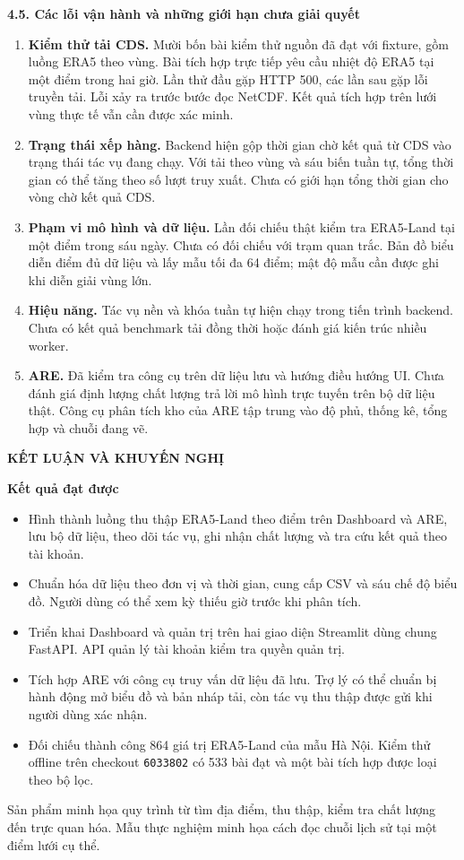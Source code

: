 \documentclass[12pt,a4paper]{article}
\newcommand{\pg}[1]{\newpage\pagenumbering{arabic}\setcounter{page}{#1}\thispagestyle{fancy}}
\newcommand{\heading}[1]{\par\medskip\noindent\textbf{#1}\par\nopagebreak}
\newcommand{\chaptertitle}[1]{\begin{center}\large\bfseries #1\end{center}}
\newcommand{\code}[1]{\texttt{#1}}
\begin{document}
\pg{35}
\heading{4.5. Các lỗi vận hành và những giới hạn chưa giải quyết}
\begin{enumerate}
\item \textbf{Kiểm thử tải CDS.} Mười bốn bài kiểm thử nguồn đã đạt với fixture, gồm luồng ERA5 theo vùng. Bài tích hợp trực tiếp yêu cầu nhiệt độ ERA5 tại một điểm trong hai giờ. Lần thử đầu gặp HTTP 500, các lần sau gặp lỗi truyền tải. Lỗi xảy ra trước bước đọc NetCDF. Kết quả tích hợp trên lưới vùng thực tế vẫn cần được xác minh.
\item \textbf{Trạng thái xếp hàng.} Backend hiện gộp thời gian chờ kết quả từ CDS vào trạng thái tác vụ đang chạy. Với tải theo vùng và sáu biến tuần tự, tổng thời gian có thể tăng theo số lượt truy xuất. Chưa có giới hạn tổng thời gian cho vòng chờ kết quả CDS.
\item \textbf{Phạm vi mô hình và dữ liệu.} Lần đối chiếu thật kiểm tra ERA5-Land tại một điểm trong sáu ngày. Chưa có đối chiếu với trạm quan trắc. Bản đồ biểu diễn điểm đủ dữ liệu và lấy mẫu tối đa 64 điểm; mật độ mẫu cần được ghi khi diễn giải vùng lớn.
\item \textbf{Hiệu năng.} Tác vụ nền và khóa tuần tự hiện chạy trong tiến trình backend. Chưa có kết quả benchmark tải đồng thời hoặc đánh giá kiến trúc nhiều worker.
\item \textbf{ARE.} Đã kiểm tra công cụ trên dữ liệu lưu và hướng điều hướng UI. Chưa đánh giá định lượng chất lượng trả lời mô hình trực tuyến trên bộ dữ liệu thật. Công cụ phân tích kho của ARE tập trung vào độ phủ, thống kê, tổng hợp và chuỗi đang vẽ.
\end{enumerate}

\pg{36}
\chaptertitle{KẾT LUẬN VÀ KHUYẾN NGHỊ}
\heading{Kết quả đạt được}
\begin{itemize}
\item Hình thành luồng thu thập ERA5-Land theo điểm trên Dashboard và ARE, lưu bộ dữ liệu, theo dõi tác vụ, ghi nhận chất lượng và tra cứu kết quả theo tài khoản.
\item Chuẩn hóa dữ liệu theo đơn vị và thời gian, cung cấp CSV và sáu chế độ biểu đồ. Người dùng có thể xem kỳ thiếu giờ trước khi phân tích.
\item Triển khai Dashboard và quản trị trên hai giao diện Streamlit dùng chung FastAPI. API quản lý tài khoản kiểm tra quyền quản trị.
\item Tích hợp ARE với công cụ truy vấn dữ liệu đã lưu. Trợ lý có thể chuẩn bị hành động mở biểu đồ và bản nháp tải, còn tác vụ thu thập được gửi khi người dùng xác nhận.
\item Đối chiếu thành công 864 giá trị ERA5-Land của mẫu Hà Nội. Kiểm thử offline trên checkout \code{6033802} có 533 bài đạt và một bài tích hợp được loại theo bộ lọc.
\end{itemize}
Sản phẩm minh họa quy trình từ tìm địa điểm, thu thập, kiểm tra chất lượng đến trực quan hóa. Mẫu thực nghiệm minh họa cách đọc chuỗi lịch sử tại một điểm lưới cụ thể.
\end{document}
